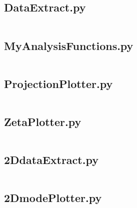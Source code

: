 \subsection{DataExtract.py}
\inputminted[python3=true,bgcolor=Black,linenos=true]{python}{VNL/PythonScripts/Scripts/DataExtract.py}
\subsection{MyAnalysisFunctions.py}
\inputminted[python3=true,bgcolor=Black,linenos=true]{python}{VNL/PythonScripts/Scripts/MyAnalysisFunctions.py}
\subsection{ProjectionPlotter.py}
\inputminted[python3=true,bgcolor=Black,linenos=true]{python}{VNL/PythonScripts/Scripts/ProjectionPlotter.py}
\subsection{ZetaPlotter.py}
\inputminted[python3=true,bgcolor=Black,linenos=true]{python}{VNL/PythonScripts/Scripts/ZetaPlotter.py}
\subsection{2DdataExtract.py}
\inputminted[python3=true,bgcolor=Black,linenos=true]{python}{VNL/PythonScripts/Scripts/2DdataExtract.py}
\subsection{2DmodePlotter.py}
\inputminted[python3=true,bgcolor=Black,linenos=true]{python}{VNL/PythonScripts/Scripts/2DmodePlotter.py}